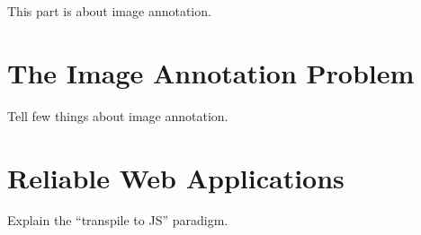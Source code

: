 This part is about image annotation.

\chapter{The Image Annotation Problem}%
\label{cha:the_image_annotation_problem}

Tell few things about image annotation.



\chapter{Reliable Web Applications}%
\label{cha:reliable_web_applications}

Explain the ``transpile to JS'' paradigm.


